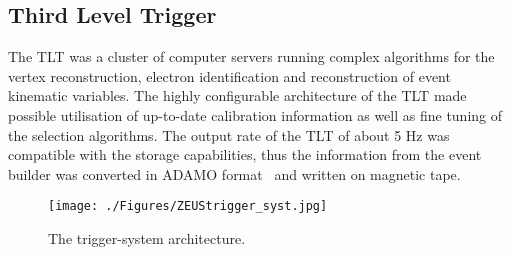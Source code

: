 \subsection{Third Level Trigger}
\label{subsec:tlt}
The TLT was a cluster of computer servers running complex algorithms for the vertex reconstruction, electron identification and reconstruction of event kinematic variables. The highly configurable architecture of the TLT made possible utilisation of up-to-date calibration information as well as fine tuning of the selection algorithms. The output rate of the TLT of about 5 Hz was compatible with the storage capabilities, thus the information from the event builder was converted in ADAMO format~\cite{adamo} and written on magnetic tape.

\begin{figure}[h]
	\centering
		\texttt{[image: ./Figures/ZEUStrigger\_syst.jpg]}
	\caption{The \zeus trigger-system architecture.}
	\label{fig:ZEUStrigger_syst}
\end{figure}
\newpage
